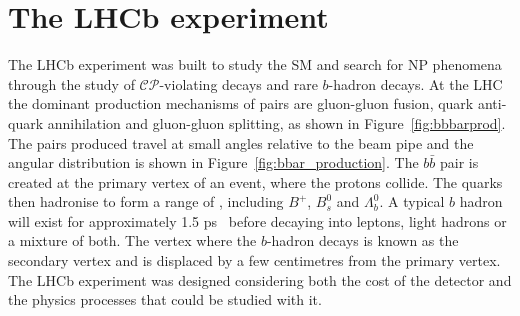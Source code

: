 \section{The LHCb experiment}
\label{LHCb}
The LHCb experiment was built to study the SM and search for NP phenomena through the study of $\mathcal{CP}$-violating decays and rare $b$-hadron decays. 
At the LHC the dominant production mechanisms of \bbbar pairs are gluon-gluon fusion, quark anti-quark annihilation and gluon-gluon splitting, as shown in Figure~\ref{fig:bbbarprod}. The \bbbar pairs produced travel at small angles relative to the beam pipe and the angular distribution is shown in Figure~\ref{fig:bbar_production}. %
The $b\bar{b}$ pair is created at the primary vertex of an event, where the protons collide. The quarks then hadronise to form a range of \bhadrons, including $B^{+}$, $B^{0}_{s}$ and $\Lambda^{0}_{b}$. %
A typical $b$ hadron will exist for approximately 1.5 ps~\cite{Olive:2016xmw} before decaying into leptons, light hadrons or a mixture of both. The vertex where the $b$-hadron decays is known as the secondary vertex and is displaced by a few centimetres from the primary vertex. %
The LHCb experiment was designed considering both the cost of the detector and the physics processes that could be studied with it. 



